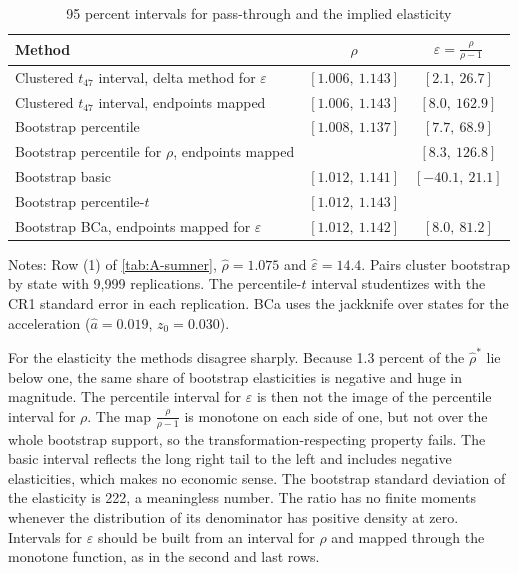 \begin{table}[htbp]
\centering
\begin{threeparttable}
\caption{95 percent intervals for pass-through and the implied elasticity}
\label{tab:A-boot-intervals}
\small
\begin{tabular}{@{}lcc@{}}
\toprule
Method & $\rho$ & $\varepsilon = \frac{\rho}{\rho - 1}$ \\
\midrule
Clustered $t_{47}$ interval, delta method for $\varepsilon$ & $[1.006,\ 1.143]$ & $[2.1,\ 26.7]$ \\
Clustered $t_{47}$ interval, endpoints mapped & $[1.006,\ 1.143]$ & $[8.0,\ 162.9]$ \\
Bootstrap percentile & $[1.008,\ 1.137]$ & $[7.7,\ 68.9]$ \\
Bootstrap percentile for $\rho$, endpoints mapped & & $[8.3,\ 126.8]$ \\
Bootstrap basic & $[1.012,\ 1.141]$ & $[-40.1,\ 21.1]$ \\
Bootstrap percentile-$t$ & $[1.012,\ 1.143]$ & \\
Bootstrap BCa, endpoints mapped for $\varepsilon$ & $[1.012,\ 1.142]$ & $[8.0,\ 81.2]$ \\
\bottomrule
\end{tabular}
\begin{tablenotes}\footnotesize
\item Notes: Row (1) of \cref{tab:A-sumner}, $\hat\rho = 1.075$ and $\hat\varepsilon = 14.4$. Pairs cluster bootstrap
by state with 9,999 replications. The percentile-$t$ interval studentizes with the CR1 standard error in each
replication. BCa uses the jackknife over states for the acceleration ($\hat a = 0.019$, $z_0 = 0.030$).
\end{tablenotes}
\end{threeparttable}
\end{table}

For the elasticity the methods disagree sharply. Because 1.3 percent of the $\hat\rho^*$ lie below one, the same
share of bootstrap elasticities is negative and huge in magnitude. The percentile interval for $\varepsilon$ is
then not the image of the percentile interval for $\rho$. The map $\frac{\rho}{\rho - 1}$ is monotone on each side of
one, but not over the whole bootstrap support, so the transformation-respecting property fails. The basic interval
reflects the long right tail to the left and includes negative elasticities, which makes no economic sense. The
bootstrap standard deviation of the elasticity is 222, a meaningless number. The ratio has no finite moments
whenever the distribution of its denominator has positive density at zero. Intervals for $\varepsilon$ should be
built from an interval for $\rho$ and mapped through the monotone function, as in the second and last rows.

